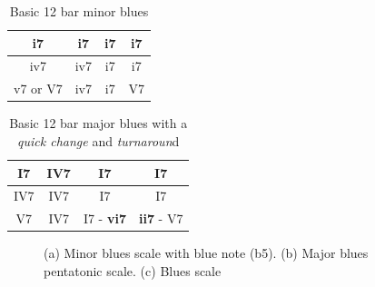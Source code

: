\documentclass{article}
\begin{document}
\begin{table}[!h]
	\caption{Basic 12 bar minor blues}
	\centering
	\begin{tabular}{| c | c | c | c |}
		\hline
		\phantom{x}i7\phantom{x} & \phantom{x}i7\phantom{x} & \phantom{x}i7\phantom{x} & \phantom{x}i7\phantom{x}  \\
		\hline
		\phantom{x}iv7\phantom{x} & \phantom{x}iv7\phantom{x} & \phantom{x}i7\phantom{x} & \phantom{x}i7\phantom{x}  \\
		\hline
		\phantom{x}v7 or V7\phantom{x} & \phantom{x}iv7\phantom{x} & \phantom{x}i7\phantom{x} & \phantom{x}V7\phantom{x}  \\
		\hline
	\end{tabular}
	\label{tab: }
\end{table}

\begin{table}[!h]
	\caption{Basic 12 bar major blues with a \textit{quick change} and \textit{turnaroun}d}
	\centering
	\begin{tabular}{| c | c | c | c |}
		\hline
		\phantom{x}I7\phantom{x} & \phantom{x}\textbf{IV7}\phantom{x} & \phantom{x}I7\phantom{x} & \phantom{x}I7\phantom{x}  \\
		\hline
		\phantom{x}IV7\phantom{x} & \phantom{x}IV7\phantom{x} & \phantom{x}I7\phantom{x} & \phantom{x}I7\phantom{x}  \\
		\hline
		\phantom{x}V7\phantom{x} & \phantom{x}IV7\phantom{x} & \phantom{x}I7 - \textbf{vi7} & \textbf{ii7} - V7\phantom{x}  \\
		\hline
	\end{tabular}
	\label{tab: }
\end{table}

\begin{figure}[h!]
	\centering
	\hspace*{-1cm}
	\scalebox{0.7}{}
	\hspace*{-1cm}
	\scalebox{0.7}{}
	\hspace*{-1cm}
	\scalebox{0.7}{}
	\caption{(a) Minor blues scale with blue note (b5). (b) Major blues pentatonic scale. (c) Blues scale  }
	\label{fig:blues_penta_mineur}
\end{figure}

\newpage
\end{document}
